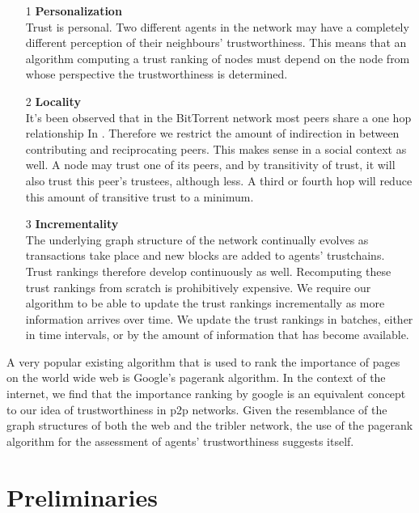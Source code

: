 \documentclass[sigconf]{acmart}
\theoremstyle{definition}
\begin{document}
\begin{itemize}
\item[1] {\bf Personalization} \\ Trust is personal. Two different agents in the network may have a completely different perception of their neighbours' trustworthiness. This means that an algorithm computing a trust ranking of nodes must depend on the node from whose perspective the trustworthiness is determined.
\item[2] {\bf Locality} \\ It's been observed that in the BitTorrent network most peers share a one hop relationship In \citep{One Hop Reputations for Peer to Peer File Sharing Workloads}. Therefore we restrict the amount of indirection in between contributing and reciprocating peers. This makes sense in a social context as well. A node may trust one of its peers, and by transitivity of trust, it will also trust this peer's trustees, although less. A third or fourth hop will reduce this amount of transitive trust to a minimum.
\item[3] {\bf Incrementality} \\
The underlying graph structure of the network continually evolves as transactions take place and new blocks are added to agents' trustchains. Trust rankings therefore develop continuously as well. Recomputing these trust rankings from scratch is prohibitively expensive. We require our algorithm to be able to update the trust rankings incrementally as more information arrives over time. We update the trust rankings in batches, either in time intervals, or by the amount of information that has become available. \vspace{1em}\\
\end{itemize}

\noindent A very popular existing algorithm that is used to rank the importance of pages on the world wide web is Google's pagerank algorithm. In the context of the internet, we find that the importance ranking by google is an equivalent concept to our idea of trustworthiness in p2p networks. Given the resemblance of the graph structures of both the web and the tribler network, the use of the pagerank algorithm for the assessment of agents' trustworthiness suggests itself.

\section{Preliminaries}
\label{sec:Preliminaries}
\end{document}
